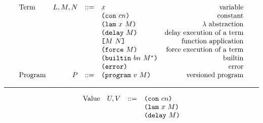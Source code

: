 \documentclass[../plutus-core-specification.tex]{subfiles}
\begin{document}
\begin{minipage}{\linewidth}
    \centering
    \[\begin{array}{lrclr}
    \textrm{Term}       & L,M,N  & ::= & x                      & \textrm{variable}\\
                        &        &     & \texttt{(} \texttt{con} ~ cn \texttt{)}               & \textrm{constant}\\
                        &        &     & \texttt{(} \texttt{lam} ~ x ~ M  \texttt{)}            & \textrm{$\lambda$ abstraction}\\
                        &        &     & \texttt{(} \texttt{delay} ~ M \texttt{)}              & \textrm{delay execution of a term}\\
                        &        &     & \texttt{[} M ~ N \texttt{]}            & \textrm{function application}\\
                        &        &     & \texttt{(} \texttt{force} ~ M \texttt{)}              & \textrm{force execution of a term}\\
                        &        &     & \texttt{(} \texttt{builtin} ~ bn ~ M^* \texttt{)}     & \textrm{builtin}\\
                        &        &     & \texttt{(} \texttt{error} \texttt{)}                & \textrm{error}\\
        \textrm{Program}& P      & ::= & \texttt{(} \texttt{program} ~ v ~ M \texttt{)}         & \textrm{versioned program}

    \end{array}\]
    \label{fig:untyped-grammar}
\end{minipage}

\medskip\hrule\medskip

\begin{minipage}{\linewidth}
    \centering
    \[\begin{array}{lrcl}
        \textrm{Value}  & U, V   & ::= & \texttt{(} \texttt{con} ~ cn \texttt{)}    \\
                        &        &     & \texttt{(} \texttt{lam} ~ x ~ M  \texttt{)} \\
                        &        &     & \texttt{(} \texttt{delay} ~ M \texttt{)}   
    \end{array}\]
    \label{fig:untyped-values}
\end{minipage}
\end{document}
